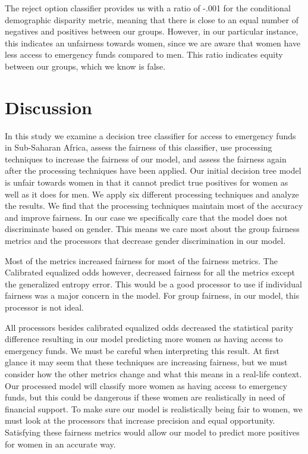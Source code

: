 \documentclass[water,article,submit,moreauthors,pdftex]{mdpi}
\begin{document}
The reject option classifier provides us with a ratio of -.001 for the
conditional demographic disparity metric, meaning that there is close to
an equal number of negatives and positives between our groups. However,
in our particular instance, this indicates an unfairness towards women,
since we are aware that women have less access to emergency funds
compared to men. This ratio indicates equity between our groups, which
we know is false.

\hypertarget{discussion}{%
\section{Discussion}\label{discussion}}

In this study we examine a decision tree classifier for access to
emergency funds in Sub-Saharan Africa, assess the fairness of this
classifier, use processing techniques to increase the fairness of our
model, and assess the fairness again after the processing techniques
have been applied. Our initial decision tree model is unfair towards
women in that it cannot predict true positives for women as well as it
does for men. We apply six different processing techniques and analyze
the results. We find that the processing techniques maintain most of the
accuracy and improve fairness. In our case we specifically care that the
model does not discriminate based on gender. This means we care most
about the group fairness metrics and the processors that decrease gender
discrimination in our model.

Most of the metrics increased fairness for most of the fairness metrics.
The Calibrated equalized odds however, decreased fairness for all the
metrics except the generalized entropy error. This would be a good
processor to use if individual fairness was a major concern in the
model. For group fairness, in our model, this processor is not ideal.

All processors besides calibrated equalized odds decreased the
statistical parity difference resulting in our model predicting more
women as having access to emergency funds. We must be careful when
interpreting this result. At first glance it may seem that these
techniques are increasing fairness, but we must consider how the other
metrics change and what this means in a real-life context. Our processed
model will classify more women as having access to emergency funds, but
this could be dangerous if these women are realistically in need of
financial support. To make sure our model is realistically being fair to
women, we must look at the processors that increase precision and equal
opportunity. Satisfying these fairness metrics would allow our model to
predict more positives for women in an accurate way.
\end{document}
